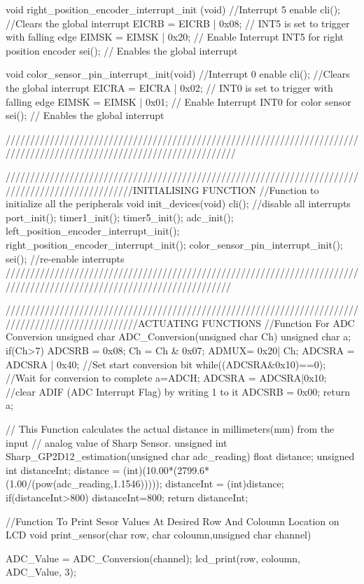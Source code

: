 void right_position_encoder_interrupt_init (void) //Interrupt 5 enable
{
	cli(); //Clears the global interrupt
	EICRB = EICRB | 0x08; // INT5 is set to trigger with falling edge
	EIMSK = EIMSK | 0x20; // Enable Interrupt INT5 for right position encoder
	sei();   // Enables the global interrupt
}

void color_sensor_pin_interrupt_init(void) //Interrupt 0 enable
{
	cli(); //Clears the global interrupt
	EICRA = EICRA | 0x02; // INT0 is set to trigger with falling edge
	EIMSK = EIMSK | 0x01; // Enable Interrupt INT0 for color sensor
	sei(); // Enables the global interrupt
}

///////////////////////////////////////////////////////////////////////////////////////////////////////////////////////

//////////////////////////////////////////////////////////////////////////////////////////////////INITIALISING FUNCTION
//Function to initialize all the peripherals
void init_devices(void)
{
	cli(); //disable all interrupts
	port_init();
	timer1_init();
	timer5_init();
	adc_init();
	left_position_encoder_interrupt_init();
	right_position_encoder_interrupt_init();
	color_sensor_pin_interrupt_init();
	sei(); //re-enable interrupts
}
//////////////////////////////////////////////////////////////////////////////////////////////////////////////////////

///////////////////////////////////////////////////////////////////////////////////////////////////ACTUATING FUNCTIONS
//Function For ADC Conversion
unsigned char ADC_Conversion(unsigned char Ch) 
{
	unsigned char a;
	if(Ch>7)
	{
		ADCSRB = 0x08;
	}
	Ch = Ch & 0x07;  			
	ADMUX= 0x20| Ch;	   		
	ADCSRA = ADCSRA | 0x40;		//Set start conversion bit
	while((ADCSRA&0x10)==0);	//Wait for conversion to complete
	a=ADCH;
	ADCSRA = ADCSRA|0x10; //clear ADIF (ADC Interrupt Flag) by writing 1 to it
	ADCSRB = 0x00;
	return a;
}

// This Function calculates the actual distance in millimeters(mm) from the input
// analog value of Sharp Sensor.
unsigned int Sharp_GP2D12_estimation(unsigned char adc_reading)
{
	float distance;
	unsigned int distanceInt;
	distance = (int)(10.00*(2799.6*(1.00/(pow(adc_reading,1.1546)))));
	distanceInt = (int)distance;
	if(distanceInt>800)
	{
		distanceInt=800;
	}
	return distanceInt;
}

//Function To Print Sesor Values At Desired Row And Coloumn Location on LCD
void print_sensor(char row, char coloumn,unsigned char channel)
{
	
	ADC_Value = ADC_Conversion(channel);
	lcd_print(row, coloumn, ADC_Value, 3);
}

